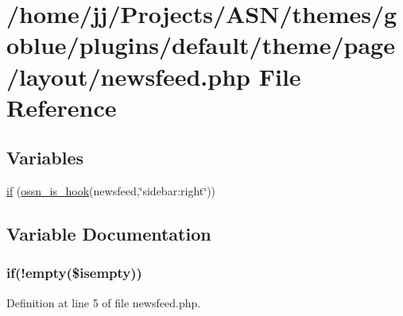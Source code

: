 \hypertarget{theme_2page_2layout_2newsfeed_8php}{}\section{/home/jj/\+Projects/\+A\+S\+N/themes/goblue/plugins/default/theme/page/layout/newsfeed.php File Reference}
\label{theme_2page_2layout_2newsfeed_8php}
\subsection*{Variables}
\begin{DoxyCompactItemize}
\item 
\hyperlink{theme_2page_2layout_2newsfeed_8php_a9b5c96837e77b2b9e8f3507d92e1e99c}{if} (\hyperlink{ossn_8lib_8system_8php_ae29c30c131d7600928d7a2fc28bcd322}{ossn\+\_\+is\+\_\+hook}(\textquotesingle{}newsfeed\textquotesingle{},\char`\"{}sidebar\+:right\char`\"{}))
\end{DoxyCompactItemize}


\subsection{Variable Documentation}
\subsubsection[{\texorpdfstring{if}{if}}]{\setlength{\rightskip}{0pt plus 5cm}if(!empty(\$isempty))}\hypertarget{theme_2page_2layout_2newsfeed_8php_a9b5c96837e77b2b9e8f3507d92e1e99c}{}\label{theme_2page_2layout_2newsfeed_8php_a9b5c96837e77b2b9e8f3507d92e1e99c}


Definition at line 5 of file newsfeed.\+php.


